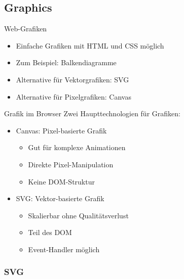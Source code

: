 \pagebreak

\subsection{Graphics}

\begin{definition}{Web-Grafiken}
\begin{itemize}
  \item Einfache Grafiken mit HTML und CSS möglich
  \item Zum Beispiel: Balkendiagramme
  \item Alternative für Vektorgrafiken: SVG
  \item Alternative für Pixelgrafiken: Canvas
\end{itemize}
\end{definition}

\begin{concept}{Grafik im Browser}
    Zwei Haupttechnologien für Grafiken:
    \begin{itemize}
        \item Canvas: Pixel-basierte Grafik
            \begin{itemize}
                \item Gut für komplexe Animationen
                \item Direkte Pixel-Manipulation
                \item Keine DOM-Struktur
            \end{itemize}
        \item SVG: Vektor-basierte Grafik
            \begin{itemize}
                \item Skalierbar ohne Qualitätsverlust
                \item Teil des DOM
                \item Event-Handler möglich
            \end{itemize}
    \end{itemize}
\end{concept}

\subsubsection{SVG}

